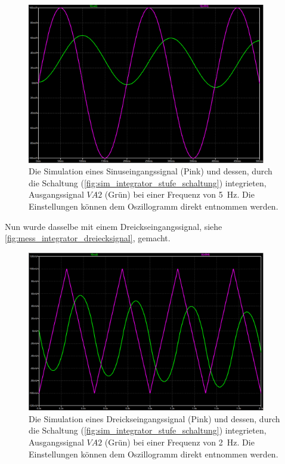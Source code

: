 \documentclass[12pt,english,ngerman]{scrartcl}
\begin{document}
\begin{figure}[H]
  \centering
    \includegraphics[width=\linewidth, height=7cm]{./figures/integrator/sim/mit_stufe/sin100mv_5hz.png}
  \caption{Die Simulation eines Sinuseingangssignal (Pink) und dessen, durch
  die Schaltung (\autoref{fig:sim_integrator_stufe_schaltung}) integrieten,
  Ausgangssignal $VA2$ (Grün) bei einer Frequenz von \SI{5}{\hertz}. Die
  Einstellungen können dem Oszillogramm direkt entnommen werden.}
  \label{fig:sim_int_stufe_sin}
\end{figure}

Nun wurde dasselbe mit einem Dreickseingangssignal, siehe
\autoref{fig:mess_integrator_dreiecksignal}, gemacht.

\begin{figure}[H]
  \centering
    \includegraphics[width=\linewidth, height=7cm]{./figures/integrator/sim/mit_stufe/dreieck100mv_500ms.png}
    \caption{Die Simulation eines Dreickseingangssignal (Pink) und dessen,
    durch die Schaltung (\autoref{fig:sim_integrator_stufe_schaltung})
    integrieten, Ausgangssignal $VA2$ (Grün) bei einer Frequenz von
    \SI{2}{\hertz}. Die Einstellungen können dem Oszillogramm direkt entnommen
    werden.}
  \label{fig:sim_int_stufe_tri}
\end{figure}
\end{document}
